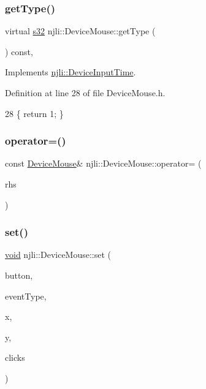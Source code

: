 \subsubsection{\texorpdfstring{get\+Type()}{getType()}}
{\footnotesize\ttfamily virtual \mbox{\hyperlink{_util_8h_aa62c75d314a0d1f37f79c4b73b2292e2}{s32}} njli\+::\+Device\+Mouse\+::get\+Type (\begin{DoxyParamCaption}{ }\end{DoxyParamCaption}) const\hspace{0.3cm}{\ttfamily [inline]}, {\ttfamily [virtual]}}



Implements \mbox{\hyperlink{classnjli_1_1_device_input_time_a69e4bb4be69f3ac53f4514a58fd61021}{njli\+::\+Device\+Input\+Time}}.



Definition at line 28 of file Device\+Mouse.\+h.


\begin{DoxyCode}
28 \{ \textcolor{keywordflow}{return} 1; \}
\end{DoxyCode}
\mbox{\label{classnjli_1_1_device_mouse_ae9fb49d3da9395268f61e508581589af}} 
\subsubsection{\texorpdfstring{operator=()}{operator=()}}
{\footnotesize\ttfamily const \mbox{\hyperlink{classnjli_1_1_device_mouse}{Device\+Mouse}}\& njli\+::\+Device\+Mouse\+::operator= (\begin{DoxyParamCaption}\item[{const \mbox{\hyperlink{classnjli_1_1_device_mouse}{Device\+Mouse}} \&}]{rhs }\end{DoxyParamCaption})}

\mbox{\label{classnjli_1_1_device_mouse_a176cdee101650df7a86e82e8834e5156}} 
\subsubsection{\texorpdfstring{set()}{set()}}
{\footnotesize\ttfamily \mbox{\hyperlink{_thread_8h_af1e856da2e658414cb2456cb6f7ebc66}{void}} njli\+::\+Device\+Mouse\+::set (\begin{DoxyParamCaption}\item[{int}]{button,  }\item[{int}]{event\+Type,  }\item[{float}]{x,  }\item[{float}]{y,  }\item[{int}]{clicks }\end{DoxyParamCaption})}



